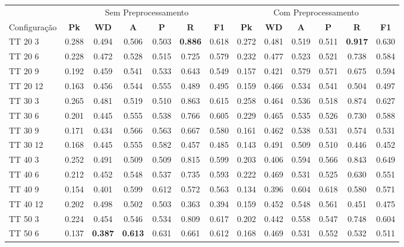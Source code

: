 \documentclass{article}
\begin{document}
 
\begin{tabular}{|l|c|c|c|c|c|c||c|c|c|c|c|c|} 
\hline 
&\multicolumn{6}{c||}{Sem Preprocessamento} & \multicolumn{6}{c|}{Com Preprocessamento}\\ 
Configuração & \textbf{Pk} & \textbf{WD} & \textbf{A } & \textbf{P } & \textbf{R } & \textbf{F1} & \textbf{Pk} & \textbf{WD} & \textbf{A } & \textbf{P } & \textbf{R } & \textbf{F1}\\ \hline
TT 20  3 & 0.288 & 0.494 & 0.506 & 0.503 & \textbf{0.886} & 0.618 & 0.272 & 0.481 & 0.519 & 0.511 & \textbf{0.917} & 0.630\\ \hline
TT 20  6 & 0.228 & 0.472 & 0.528 & 0.515 & 0.725 & 0.579 & 0.232 & 0.477 & 0.523 & 0.521 & 0.738 & 0.584\\ \hline
TT 20  9 & 0.192 & 0.459 & 0.541 & 0.533 & 0.643 & 0.549 & 0.157 & 0.421 & 0.579 & 0.571 & 0.675 & 0.594\\ \hline
TT 20 12 & 0.163 & 0.456 & 0.544 & 0.555 & 0.489 & 0.495 & 0.159 & 0.466 & 0.534 & 0.541 & 0.504 & 0.497\\ \hline
TT 30  3 & 0.265 & 0.481 & 0.519 & 0.510 & 0.863 & 0.615 & 0.258 & 0.464 & 0.536 & 0.518 & 0.874 & 0.627\\ \hline
TT 30  6 & 0.201 & 0.445 & 0.555 & 0.538 & 0.766 & 0.605 & 0.229 & 0.465 & 0.535 & 0.526 & 0.730 & 0.588\\ \hline
TT 30  9 & 0.171 & 0.434 & 0.566 & 0.563 & 0.667 & 0.580 & 0.161 & 0.462 & 0.538 & 0.531 & 0.574 & 0.531\\ \hline
TT 30 12 & 0.168 & 0.445 & 0.555 & 0.582 & 0.457 & 0.485 & 0.143 & 0.491 & 0.509 & 0.510 & 0.446 & 0.452\\ \hline
TT 40  3 & 0.252 & 0.491 & 0.509 & 0.509 & 0.815 & 0.599 & 0.203 & 0.406 & 0.594 & 0.566 & 0.843 & 0.649\\ \hline
TT 40  6 & 0.212 & 0.452 & 0.548 & 0.537 & 0.735 & 0.593 & 0.222 & 0.469 & 0.531 & 0.525 & 0.630 & 0.551\\ \hline
TT 40  9 & 0.154 & 0.401 & 0.599 & 0.612 & 0.572 & 0.563 & 0.134 & 0.396 & 0.604 & 0.618 & 0.580 & 0.571\\ \hline
TT 40 12 & 0.202 & 0.498 & 0.502 & 0.503 & 0.363 & 0.394 & 0.159 & 0.452 & 0.548 & 0.561 & 0.451 & 0.475\\ \hline
TT 50  3 & 0.224 & 0.454 & 0.546 & 0.534 & 0.809 & 0.617 & 0.202 & 0.442 & 0.558 & 0.547 & 0.748 & 0.604\\ \hline
TT 50  6 & 0.137 & \textbf{0.387} & \textbf{0.613} & 0.631 & 0.661 & 0.612 & 0.168 & 0.469 & 0.531 & 0.552 & 0.532 & 0.511\\ \hline

\end{tabular}
\end{document}
